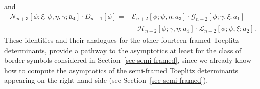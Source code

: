 \documentclass[pdftex]{sigma}
\numberwithin{equation}{section}
\newcommand{\ga}{\gamma}
\begin{document}
		and
		\begin{align*}%
			\mathscr{N}_{n+3}[\phi; \xi, \psi, \eta, \ga; \boldsymbol{a}_4] \cdot D_{n+1}[\phi]={}& \mathscr{E}_{n+2}[\phi;\psi,\eta;a_3] \cdot \mathscr{G}_{n+2}[\phi;\ga,\xi;a_1] \\
&- \mathscr{H}_{n+2}[\phi;\ga,\eta;a_4] \cdot \mathscr{L}_{n+2}[\phi;\psi,\xi;a_2].
		\end{align*}
		These identities and their analogues for the other fourteen framed Toeplitz determinants, provide a pathway to the asymptotics at least for the class of border symbols considered in Section~\ref{sec semi-framed}, since we already know how to compute the asymptotics of the semi-framed Toeplitz determinants appearing on the right-hand side (see Section~\ref{sec semi-framed}).
		
\end{document}
